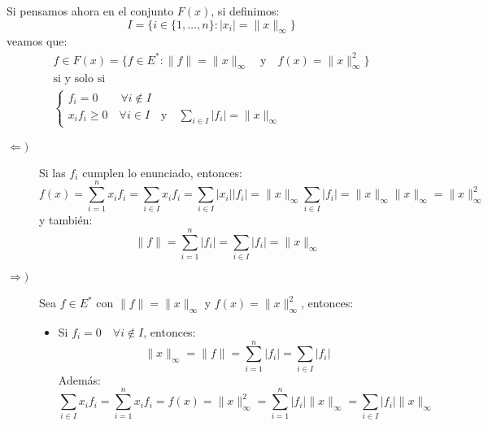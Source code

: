\begin{ejercicio}
\begin{enumerate}[label=\alph*)]
            Si pensamos ahora en el conjunto $F(x)$, si definimos:
            \begin{equation*}
                I = \{i \in \{1,\ldots,n\} : |x_i| = \|x\|_\infty\}
            \end{equation*}
            veamos que:
            \begin{gather*}
                f\in F(x) = \{f\in E^\ast : \|f\| = \|x\|_\infty \quad \text{y}\quad f(x) = \|x\|_\infty^2\} \\
                \text{si y solo si} \\
                \left\{\begin{array}{l}
                    f_i = 0 \qquad \forall i \notin I \\
                    x_if_i \geq 0 \quad \forall i \in I \quad \text{y}\quad \sum_{i \in I}|f_i| = \|x\|_\infty
                \end{array}\right.
            \end{gather*}
            \begin{description}
                \item [$\Longleftarrow )$] Si las $f_i$ cumplen lo enunciado, entonces:
                    \begin{equation*}
                        f(x) = \sum_{i=1}^{n} x_if_i = \sum_{i \in I} x_if_i = \sum_{i \in I}|x_i||f_i| = \|x\|_\infty \sum_{i \in I}|f_i| = \|x\|_\infty \|x\|_\infty = \|x\|_\infty^2
                    \end{equation*}
                    y también:
                    \begin{equation*}
                        \|f\| = \sum_{i=1}^{n} |f_i| = \sum_{i \in I} |f_i| = \|x\|_\infty
                    \end{equation*}
                \item [$\Longrightarrow )$] Sea $f\in E^\ast$ con $\|f\| = \|x\|_\infty$ y $f(x) = \|x\|_\infty^2$, entonces:
                    \begin{itemize}
                        \item Si $f_i = 0\quad \forall i\notin I$, entonces:
                            \begin{equation*}
                                \|x\|_\infty = \|f\| = \sum_{i=1}^{n}|f_i| = \sum_{i \in I}|f_i|
                            \end{equation*}
                            Además:
                            \begin{equation*}
                                \sum_{i \in I} x_if_i = \sum_{i=1}^{n}x_if_i = f(x) =  \|x\|_\infty^2 = \sum_{i=1}^{n}|f_i|\|x\|_\infty = \sum_{i \in I}|f_i|\|x\|_\infty

\end{equation*}
\end{itemize}
\end{description}
\end{enumerate}
\end{ejercicio}
